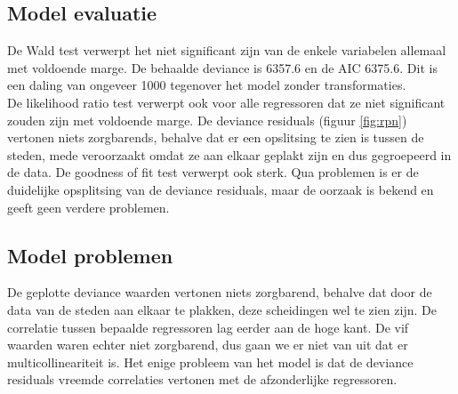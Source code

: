 \documentclass[a4paper,kulak]{kulakarticle} %
\begin{document}
\subsection{Model evaluatie}

De Wald test verwerpt het niet significant zijn van de enkele variabelen allemaal  met voldoende marge.
De behaalde deviance is 6357.6 en de AIC 6375.6.
Dit is een daling van ongeveer 1000 tegenover het model zonder transformaties.\\


De likelihood ratio test verwerpt ook voor alle regressoren dat ze niet significant zouden zijn met voldoende marge.
De deviance residuals (figuur \ref{fig:rpn}) vertonen niets zorgbarends, behalve dat er een opslitsing te zien is tussen de steden, mede veroorzaakt omdat ze aan elkaar geplakt zijn en dus gegroepeerd in de data.
De goodness of fit test verwerpt ook sterk.
Qua problemen is er de duidelijke opsplitsing van de deviance residuals, maar de oorzaak is bekend en geeft geen verdere problemen.
\subsection{Model problemen}
De geplotte deviance waarden vertonen niets zorgbarend, behalve dat door de data van de steden aan elkaar te plakken, deze scheidingen wel te zien zijn.
De correlatie tussen bepaalde regressoren lag eerder aan de hoge kant.
De vif waarden waren echter niet zorgbarend, dus gaan we er niet van uit dat er multicollineariteit is.
Het enige probleem van het model is dat de deviance residuals vreemde correlaties vertonen met de afzonderlijke regressoren.
\end{document}
